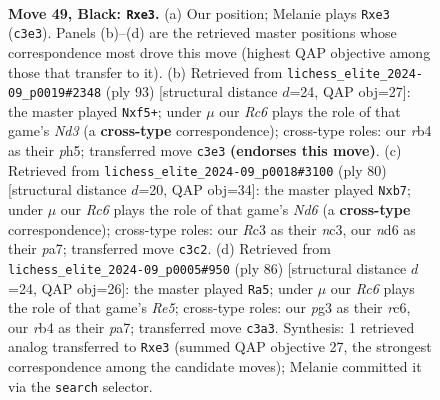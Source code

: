 \documentclass[11pt]{article}
\begin{document}
\clearpage

\begin{figure}[p]\centering
\begin{subfigure}{0.46\textwidth}\centering
\resizebox{\linewidth}{!}{%
\newchessgame
\chessboard[
  setfen={7k/6p1/3Npp2/7p/1R1P1P1P/2r1P1P1/6K1/8 b - - 0 49},
  showmover=false,
  pgfstyle=straightmove, color=movearrow, markmove={c3-e3}
]}
\caption{}
\end{subfigure}\hfill
\begin{subfigure}{0.46\textwidth}\centering
\resizebox{\linewidth}{!}{%
\newchessgame
\chessboard[
  setfen={5k2/6p1/2Nn1pPp/3p1P1P/P7/1P2KP2/8/8 b - - 2 47},
  showmover=false,
  pgfstyle=straightmove, color=movearrow, markmove={d6-f5}
]}
\caption{}
\end{subfigure}
\\[4pt]
\begin{subfigure}{0.46\textwidth}\centering
\resizebox{\linewidth}{!}{%
\newchessgame
\chessboard[
  setfen={8/pp4pk/2pN1p1p/7P/PP4P1/2n4K/8/8 w - - 0 41},
  showmover=false,
  pgfstyle=straightmove, color=movearrow, markmove={d6-b7}
]}
\caption{}
\end{subfigure}\hfill
\begin{subfigure}{0.46\textwidth}\centering
\resizebox{\linewidth}{!}{%
\newchessgame
\chessboard[
  setfen={8/p4k2/p1r4p/4R1pP/P4p2/5P2/6PK/8 w - - 8 44},
  showmover=false,
  pgfstyle=straightmove, color=movearrow, markmove={e5-a5}
]}
\caption{}
\end{subfigure}
\caption{\textbf{Move 49, Black: \texttt{Rxe3}.} (a) Our position; Melanie plays \texttt{Rxe3} (\texttt{c3e3}). Panels (b)--(d) are the retrieved master positions whose correspondence most drove this move (highest QAP objective among those that transfer to it). (b) Retrieved from \texttt{lichess\_elite\_2024-09\_p0019\#2348} (ply 93) [structural distance $d$=24, QAP obj=27]: the master played \texttt{Nxf5+}; under $\mu$ our \emph{Rc6} plays the role of that game's \emph{Nd3} (a \textbf{cross-type} correspondence); cross-type roles: our \emph{r}b4 as their \emph{p}h5; transferred move \texttt{c3e3} \textbf{(endorses this move)}. (c) Retrieved from \texttt{lichess\_elite\_2024-09\_p0018\#3100} (ply 80) [structural distance $d$=20, QAP obj=34]: the master played \texttt{Nxb7}; under $\mu$ our \emph{Rc6} plays the role of that game's \emph{Nd6} (a \textbf{cross-type} correspondence); cross-type roles: our \emph{R}c3 as their \emph{n}c3, our \emph{n}d6 as their \emph{p}a7; transferred move \texttt{c3c2}. (d) Retrieved from \texttt{lichess\_elite\_2024-09\_p0005\#950} (ply 86) [structural distance $d$=24, QAP obj=26]: the master played \texttt{Ra5}; under $\mu$ our \emph{Rc6} plays the role of that game's \emph{Re5}; cross-type roles: our \emph{p}g3 as their \emph{r}c6, our \emph{r}b4 as their \emph{p}a7; transferred move \texttt{c3a3}. Synthesis: 1 retrieved analog transferred to \texttt{Rxe3} (summed QAP objective 27, the strongest correspondence among the candidate moves); Melanie committed it via the \texttt{search} selector.}
\label{fig:thought-m97}
\end{figure}
\end{document}
